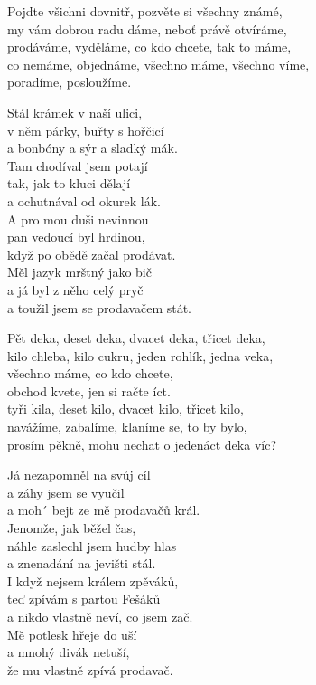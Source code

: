 
\re{}
Pojďte všichni dovnitř, pozvěte si všechny známé,\\
my vám dobrou radu dáme, neboť právě otvíráme,\\
prodáváme, vyděláme, co kdo chcete, tak to máme,\\
co nemáme, objednáme, všechno máme, všechno víme,\\
poradíme, posloužíme.

\ve{}
Stál krámek v naší ulici,\\
v něm párky, buřty s hořčicí\\
a bonbóny a sýr a sladký mák.\\
Tam chodíval jsem potají\\
tak, jak to kluci dělají\\
a ochutnával od okurek lák.\\
A pro mou duši nevinnou\\
pan vedoucí byl hrdinou,\\
když po obědě začal prodávat.\\
Měl jazyk mrštný jako bič\\
a já byl z něho celý pryč\\
a toužil jsem se prodavačem stát.

\cho{}
Pět deka, deset deka, dvacet deka, třicet deka,\\
kilo chleba, kilo cukru, jeden rohlík, jedna veka,\\
všechno máme, co kdo chcete,\\
obchod kvete, jen si račte íct.\\
tyři kila, deset kilo, dvacet kilo, třicet kilo,\\
navážíme, zabalíme, klaníme se, to by bylo,\\
prosím pěkně, mohu nechat o jedenáct deka víc?

\ve{}
Já nezapomněl na svůj cíl\\
a záhy jsem se vyučil\\
a moh´ bejt ze mě prodavačů král.\\
Jenomže, jak běžel čas,\\
náhle zaslechl jsem hudby hlas\\
a znenadání na jevišti stál.\\
I když nejsem králem zpěváků,\\
teď zpívám s partou Fešáků\\
a nikdo vlastně neví, co jsem zač.\\
Mě potlesk hřeje do uší\\
a mnohý divák netuší,\\
že mu vlastně zpívá prodavač.

